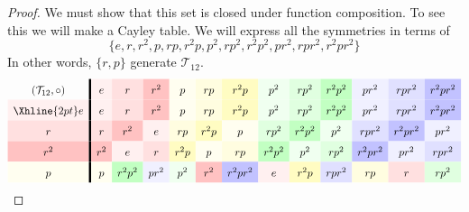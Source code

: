 \documentclass{ximera}
\begin{document}
\begin{example}
\begin{proof}
    We must show that this set is closed under function composition.
    To see this we will make a Cayley table. We will express all the
    symmetries in terms of
    \[
    \{e,r,r^2,p,rp,r^2p,p^2,rp^2,r^2p^2,pr^2,rpr^2,r^2pr^2\}
    \]
    In other words, $\{r,p\}$ generate $\mathcal{T}_{12}$.  
    \begin{gather*}
    \renewcommand{\arraystretch}{1.6}
      \begin{array}{c!{\vline width 2pt}cccccccccccc}
      (\mathcal{T}_{12},\circ)& e\cellcolor{red!6!white}     & r\cellcolor{red!12!white}     & r^2\cellcolor{red!24!white}   & p \cellcolor{yellow!6!white}    & rp \cellcolor{yellow!12!white}  & r^2 p\cellcolor{yellow!24!white} & p^2\cellcolor{green!6!white}    &  r p^2\cellcolor{green!12!white}  &  r^2 p^2\cellcolor{green!24!white} & pr^2 \cellcolor{blue!6!white} & rpr^2 \cellcolor{blue!12!white}& r^2 p r^2\cellcolor{blue!24!white}\\  \Xhline{2pt}
      e \cellcolor{red!6!white}         & e\cellcolor{red!6!white}         & r\cellcolor{red!12!white}           & r^2\cellcolor{red!24!white}   & p \cellcolor{yellow!6!white}    & rp \cellcolor{yellow!12!white}  & r^2 p\cellcolor{yellow!24!white} & p^2\cellcolor{green!6!white}    &  r p^2\cellcolor{green!12!white}  &  r^2 p^2\cellcolor{green!24!white} & pr^2 \cellcolor{blue!6!white} & rpr^2 \cellcolor{blue!12!white}& r^2 p r^2\cellcolor{blue!24!white}\\ 
      r\cellcolor{red!12!white}         & r\cellcolor{red!12!white}        & r^2\cellcolor{red!24!white}            & e\cellcolor{red!6!white}     & rp\cellcolor{yellow!12!white} & r^2p \cellcolor{yellow!24!white}    & p \cellcolor{yellow!6!white}   & rp^2 \cellcolor{green!12!white}  & r^2p^2 \cellcolor{green!24!white} & p^2 \cellcolor{green!6!white} & r pr^2 \cellcolor{blue!12!white} & r^2 pr^2 \cellcolor{blue!24!white} & pr^2 \cellcolor{blue!6!white}\\  
      r^2\cellcolor{red!24!white}       & r^2\cellcolor{red!24!white}      & e\cellcolor{red!6!white}           & r\cellcolor{red!12!white}    & r^2 p \cellcolor{yellow!24!white}   & p \cellcolor{yellow!6!white} & rp \cellcolor{yellow!12!white}   &  r^2p^2 \cellcolor{green!24!white}  & p^2 \cellcolor{green!6!white} & rp^2\cellcolor{green!12!white}  & r^2pr^2\cellcolor{blue!24!white} & pr^2\cellcolor{blue!6!white} & rpr^2\cellcolor{blue!12!white}\\  
      p \cellcolor{yellow!6!white}      & p \cellcolor{yellow!6!white}     & r^2p^2 \cellcolor{green!24!white}   & pr^2 \cellcolor{blue!6!white} & p^2\cellcolor{green!6!white}    & r^2\cellcolor{red!24!white}    & r^2pr^2\cellcolor{blue!24!white}  & e \cellcolor{red!6!white} & r^2p \cellcolor{yellow!24!white} &  rpr^2\cellcolor{blue!12!white}  &  rp \cellcolor{yellow!12!white}  &  r \cellcolor{red!12!white}  &  rp^2 \cellcolor{green!12!white}   \\

\end{array}
\end{gather*}
\end{proof}
\end{example}
\end{document}
